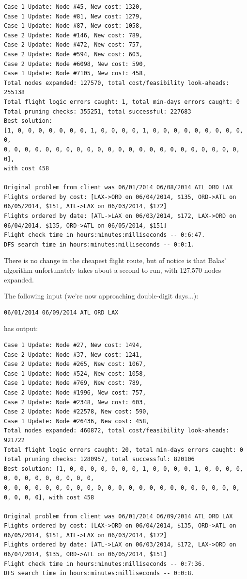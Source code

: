 \documentclass{article}
\begin{document}
\scriptsize
\begin{verbatim}
Case 1 Update: Node #45, New cost: 1320, 
Case 1 Update: Node #81, New cost: 1279, 
Case 1 Update: Node #87, New cost: 1058, 
Case 2 Update: Node #146, New cost: 789, 
Case 2 Update: Node #472, New cost: 757, 
Case 2 Update: Node #594, New cost: 603, 
Case 2 Update: Node #6098, New cost: 590, 
Case 1 Update: Node #7105, New cost: 458, 
Total nodes expanded: 127570, total cost/feasibility look-aheads: 255138
Total flight logic errors caught: 1, total min-days errors caught: 0
Total pruning checks: 355251, total successful: 227683
Best solution:
[1, 0, 0, 0, 0, 0, 0, 0, 1, 0, 0, 0, 0, 1, 0, 0, 0, 0, 0, 0, 0, 0, 0, 0,
0, 0, 0, 0, 0, 0, 0, 0, 0, 0, 0, 0, 0, 0, 0, 0, 0, 0, 0, 0, 0, 0, 0, 0],
with cost 458

Original problem from client was 06/01/2014 06/08/2014 ATL ORD LAX
Flights ordered by cost: [LAX->ORD on 06/04/2014, $135, ORD->ATL on 06/05/2014, $151, ATL->LAX on 06/03/2014, $172]
Flights ordered by date: [ATL->LAX on 06/03/2014, $172, LAX->ORD on 06/04/2014, $135, ORD->ATL on 06/05/2014, $151]
Flight check time in hours:minutes:milliseconds -- 0:6:47.
DFS search time in hours:minutes:milliseconds -- 0:0:1.
\end{verbatim}
\normalsize

There is no change in the cheapest flight route, but of notice is that Balas' algorithm unfortunately takes about a second to run, with 127,570 nodes
expanded.

The following input (we're now approaching double-digit days...):

\begin{verbatim}
06/01/2014 06/09/2014 ATL ORD LAX
\end{verbatim}

has output:

\scriptsize
\begin{verbatim}
Case 1 Update: Node #27, New cost: 1494, 
Case 2 Update: Node #37, New cost: 1241, 
Case 2 Update: Node #265, New cost: 1067, 
Case 1 Update: Node #524, New cost: 1058, 
Case 1 Update: Node #769, New cost: 789, 
Case 2 Update: Node #1996, New cost: 757, 
Case 2 Update: Node #2348, New cost: 603, 
Case 2 Update: Node #22578, New cost: 590, 
Case 1 Update: Node #26436, New cost: 458, 
Total nodes expanded: 460872, total cost/feasibility look-aheads: 921722
Total flight logic errors caught: 20, total min-days errors caught: 0
Total pruning checks: 1280957, total successful: 820106
Best solution: [1, 0, 0, 0, 0, 0, 0, 0, 1, 0, 0, 0, 0, 1, 0, 0, 0, 0, 0, 0, 0, 0, 0, 0, 0, 0, 0,
0, 0, 0, 0, 0, 0, 0, 0, 0, 0, 0, 0, 0, 0, 0, 0, 0, 0, 0, 0, 0, 0, 0, 0, 0, 0, 0], with cost 458

Original problem from client was 06/01/2014 06/09/2014 ATL ORD LAX
Flights ordered by cost: [LAX->ORD on 06/04/2014, $135, ORD->ATL on 06/05/2014, $151, ATL->LAX on 06/03/2014, $172]
Flights ordered by date: [ATL->LAX on 06/03/2014, $172, LAX->ORD on 06/04/2014, $135, ORD->ATL on 06/05/2014, $151]
Flight check time in hours:minutes:milliseconds -- 0:7:36.
DFS search time in hours:minutes:milliseconds -- 0:0:8.
\end{verbatim}
\normalsize
\end{document}
